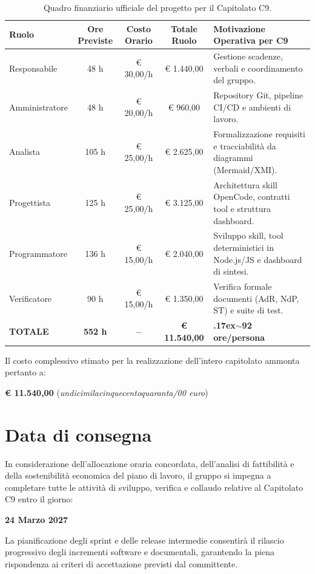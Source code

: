 \documentclass[a4paper, 11pt]{article}
\newcommand{\nmytilde}{\raise.17ex\hbox{$\scriptstyle\mathtt{\sim}$}}
\begin{document}
\begin{table}[h!]
\centering
\begin{tabularx}{\textwidth}{|l|c|c|c|X|}
    \hline
    \textbf{Ruolo} & \textbf{Ore Previste} & \textbf{Costo Orario} & \textbf{Totale Ruolo} & \textbf{Motivazione Operativa per C9} \\ \hline
    Responsabile   & 48 h  & € 30,00/h & € 1.440,00 & Gestione scadenze, verbali e coordinamento del gruppo. \\ \hline
    Amministratore & 48 h  & € 20,00/h & € 960,00   & Repository Git, pipeline CI/CD e ambienti di lavoro. \\ \hline
    Analista       & 105 h & € 25,00/h & € 2.625,00 & Formalizzazione requisiti e tracciabilità da diagrammi (Mermaid/XMI). \\ \hline
    Progettista    & 125 h & € 25,00/h & € 3.125,00 & Architettura skill OpenCode, contratti tool e struttura dashboard. \\ \hline
    Programmatore  & 136 h & € 15,00/h & € 2.040,00 & Sviluppo skill, tool deterministici in Node.js/JS e dashboard di sintesi. \\ \hline
    Verificatore   & 90 h  & € 15,00/h & € 1.350,00 & Verifica formale documenti (AdR, NdP, ST) e suite di test. \\ \hline
    \textbf{TOTALE} & \textbf{552 h} & \textbf{--} & \textbf{€ 11.540,00} & \textbf{\nmytilde92 ore/persona} \\ \hline
\end{tabularx}
\caption{Quadro finanziario ufficiale del progetto per il Capitolato C9.}
\end{table}

\vspace{0.6cm}

\noindent
Il costo complessivo stimato per la realizzazione dell'intero capitolato ammonta pertanto a:
\begin{center}
    {\Large \textbf{€ 11.540,00} \quad (\textit{undicimilacinquecentoquaranta/00 euro})}
\end{center}

\vspace{1cm}

\section{Data di consegna}
In considerazione dell'allocazione oraria concordata, dell'analisi di fattibilità e della sostenibilità economica del piano di lavoro, il gruppo si impegna a completare tutte le attività di sviluppo, verifica e collaudo relative al Capitolato C9 entro il giorno:

\vspace{0.6cm}

\begin{center}
    {\LARGE \textbf{24 Marzo 2027}}
\end{center}

\vspace{0.8cm}

\noindent
La pianificazione degli sprint e delle release intermedie consentirà il rilascio progressivo degli incrementi software e documentali, garantendo la piena rispondenza ai criteri di accettazione previsti dal committente.
\end{document}
